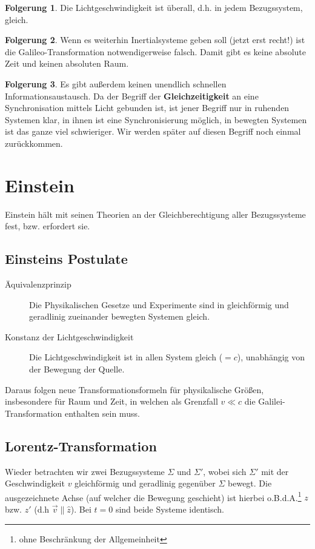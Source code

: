 \documentclass[oneside]{book}
\theoremstyle{definition}
\newtheorem*{folgerung*}{Folgerung}
\begin{document}
\begin{folgerung*}
	Die Lichtgeschwindigkeit ist überall, d.h. in jedem Bezugssystem, gleich.
\end{folgerung*}
\begin{folgerung*}
	Wenn es weiterhin Inertialsysteme geben soll (jetzt erst recht!) ist die Galileo-Transformation notwendigerweise falsch. Damit gibt es keine absolute Zeit und keinen absoluten Raum.
\end{folgerung*}
\begin{folgerung*}
	Es gibt außerdem keinen unendlich schnellen Informationsaustausch. Da der Begriff der \textbf{Gleichzeitigkeit} an eine Synchronisation mittels Licht gebunden ist, ist jener Begriff nur in ruhenden Systemen klar, in ihnen ist eine Synchronisierung möglich, in bewegten Systemen ist das ganze viel schwieriger. Wir werden später auf diesen Begriff noch einmal zurückkommen.
\end{folgerung*}

\section{Einstein}
Einstein hält mit seinen Theorien an der Gleichberechtigung aller Bezugssysteme fest, bzw. erfordert sie.

\subsection{Einsteins Postulate}
\begin{description}
	\item[Äquivalenzprinzip] Die Physikalischen Gesetze und Experimente sind in gleichförmig und geradlinig zueinander bewegten Systemen gleich.
	\item[Konstanz der Lichtgeschwindigkeit] Die Lichtgeschwindigkeit ist in allen System gleich ($=c$), unabhängig von der Bewegung der Quelle. 
\end{description}
Daraus folgen neue Transformationsformeln für physikalische Größen, insbesondere für Raum und Zeit, in welchen als Grenzfall $v \ll c$ die Galilei-Transformation enthalten sein muss.

\subsection{Lorentz-Transformation}
Wieder betrachten wir zwei Bezugssysteme $\Sigma$ und $\Sigma'$, wobei sich $\Sigma'$ mit der Geschwindigkeit $v$ gleichförmig und geradlinig gegenüber $\Sigma$ bewegt. Die ausgezeichnete Achse (auf welcher die Bewegung geschieht) ist hierbei o.B.d.A.\footnote{ohne Beschränkung der Allgemeinheit} $z$ bzw. $z'$ (d.h $\vec{v} \parallel \hat{z}$). Bei $t = 0$ sind beide Systeme identisch.
\end{document}
